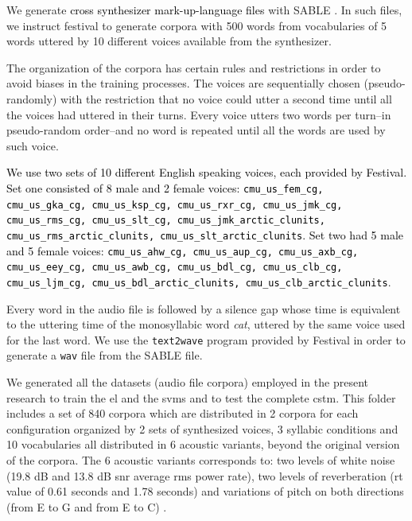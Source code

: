 \documentclass[10pt,letterpaper]{article}
\newcommand{\reviewertwo}[1]{\textcolor{black}{#1}}
\newcommand{\reviewerfour}[1]{\textcolor{black}{#1}}
\begin{document}

We generate \reviewertwo{cross synthesizer mark-up-language files} with SABLE \cite{sable}.
In such files, we instruct \gls{festival} to generate corpora with 500 words from vocabularies of
5 words uttered by 10 different voices available from the synthesizer.

The organization of the corpora has certain rules and restrictions in order to avoid biases in the training processes.
The voices are sequentially chosen (pseudo-randomly) with the restriction that no voice could utter a second time until all the voices had uttered in their turns. Every voice utters two words per turn--in pseudo-random order--and no word is repeated until all the words are used by such voice. 

\reviewerfour{We use two sets of 10 different English speaking voices, each provided by Festival. Set one consisted of 8 male and 2 female voices: \texttt{cmu\_us\_fem\_cg, cmu\_us\_gka\_cg, cmu\_us\_ksp\_cg, cmu\_us\_rxr\_cg, cmu\_us\_jmk\_cg, cmu\_us\_rms\_cg, cmu\_us\_slt\_cg, cmu\_us\_jmk\_arctic\_clunits, cmu\_us\_rms\_arctic\_clunits, cmu\_us\_slt\_arctic\_clunits}. Set two had 5 male and 5 female voices: \texttt{cmu\_us\_ahw\_cg, cmu\_us\_aup\_cg, cmu\_us\_axb\_cg, cmu\_us\_eey\_cg, cmu\_us\_awb\_cg, cmu\_us\_bdl\_cg, cmu\_us\_clb\_cg, cmu\_us\_ljm\_cg, cmu\_us\_bdl\_arctic\_clunits, cmu\_us\_clb\_arctic\_clunits}}.

Every word in the audio file is followed by a silence gap whose time is equivalent to the uttering time of the monosyllabic word \textit{cat}, uttered by the same voice used for the last word. We use the \texttt{text2wave} program provided by Festival in order to generate a \texttt{wav} file from the SABLE file.

We generated all the datasets (audio file corpora) employed in the present research to train the \gls{el} and the \glspl{svm} and to test the complete \gls{cstm}. This folder includes a set of 840 corpora which are distributed in 2 corpora for each configuration organized by 2 sets of synthesized voices, 3 syllabic conditions and 10 vocabularies all distributed in 6 acoustic variants, beyond the original version of the corpora. The 6 acoustic variants corresponds to: two levels of white noise (19.8 dB and 13.8 dB \gls{snr} average \gls{rms} power rate), two levels of reverberation (\gls{rt} value of 0.61 seconds and 1.78 seconds) and variations of pitch on both directions (from E to G and from E to C) \cite{dematties_dario_2019_2576130}.
\end{document}
